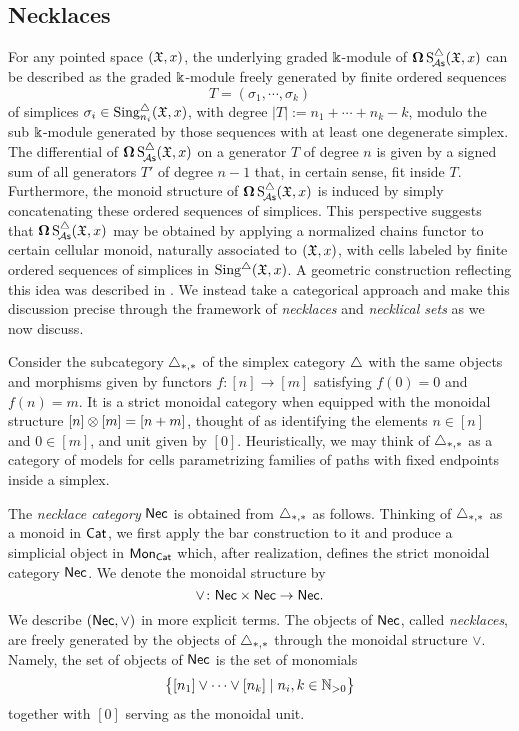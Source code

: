 \subsection{Necklaces}

For any pointed space $(\mathfrak{X},x)$, the underlying graded $\Bbbk$-module of $\operatorname{\mathbf{\Omega}} \operatorname{S^{\triangle}_{\!{\mathcal{A}\mathsf{s}}}}(\mathfrak{X},x)$ can be described as the graded $\Bbbk$-module freely generated by finite ordered sequences
\[T=(\sigma_1, \cdots, \sigma_k)\]
of simplices $\sigma_i \in \text{Sing}^{\triangle}_{n_i}(\mathfrak{X},x)$, with degree $|T|:= n_1 + \cdots + n_k -k$,  modulo the sub $\Bbbk$-module generated by those sequences with at least one degenerate simplex. The differential of $\operatorname{\mathbf{\Omega}} \operatorname{S^{\triangle}_{\!{\mathcal{A}\mathsf{s}}}}(\mathfrak{X},x)$ on a generator $T$ of degree $n$ is given by a signed sum of all generators $T'$ of degree $n-1$ that, in certain sense, fit inside $T$. Furthermore, the monoid structure of $\operatorname{\mathbf{\Omega}} \operatorname{S^{\triangle}_{\!{\mathcal{A}\mathsf{s}}}}(\mathfrak{X},x)$ is induced by simply concatenating these ordered sequences of simplices. This perspective suggests that $\operatorname{\mathbf{\Omega}} \operatorname{S^{\triangle}_{\!{\mathcal{A}\mathsf{s}}}}(\mathfrak{X},x)$ may be obtained by applying a normalized chains functor to certain cellular monoid, naturally associated to $(\mathfrak{X},x)$, with cells labeled by finite ordered sequences of simplices in $\operatorname{Sing^{\triangle}}(\mathfrak{X},x)$. A geometric construction reflecting this idea was described in \cite{baues1980geometry}. We instead take a categorical approach and make this discussion precise through the framework of \textit{necklaces} and \textit{necklical sets} as we now discuss. 

Consider the subcategory $\triangle_{*,*}$ of the simplex category $\triangle$ with the same objects and morphisms given by functors $f \colon [n] \to [m]$ satisfying $f(0) = 0$ and $f(n) = m$.
It is a strict monoidal category when equipped with the monoidal structure $[n] \otimes [m] = [n+m]$, thought of as identifying the elements $n \in [n]$ and $0 \in [m]$, and unit given by $[0]$. Heuristically, we may think of $\triangle_{*,*}$ as a category of models for cells parametrizing families of paths with fixed endpoints inside a simplex. 



The \textit{necklace category} $\mathsf{Nec}$ is obtained from $\triangle_{*,*}$ as follows.
Thinking of $\triangle_{*,*}$ as a monoid in $\mathsf{Cat}$, we first apply the bar construction to it and produce a simplicial object in $\mathsf{Mon}_{\mathsf{Cat}}$ which, after realization, defines the strict monoidal category $\mathsf{Nec}$.
We denote the monoidal structure by
\[
\vee \colon \mathsf{Nec} \times \mathsf{Nec} \to \mathsf{Nec}.
\]
We describe $(\mathsf{Nec}, \vee)$ in more explicit terms.
The objects of $\mathsf{Nec}$, called \textit{necklaces}, are freely generated by the objects of $\triangle_{*,*}$ through the monoidal structure $\vee$.
Namely, the set of objects of $\mathsf{Nec}$ is the set of monomials
\[
\big\{ [n_1] \vee \dots \vee[n_k] \mid n_i, k \in \mathbb{N}_{>0} \big\}
\]
together with $[0]$ serving as the monoidal unit.

